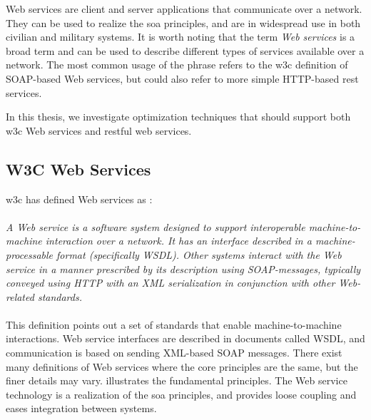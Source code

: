 Web services are client and server applications that communicate over a network.
They can be used to realize the \gls{soa} principles, and are in widespread use
in both civilian and military systems. It is worth noting that the term
\textit{Web services} is a broad term and can be used to describe different
types of services available over a network. The most common usage of the phrase
refers to the \gls{w3c} definition of SOAP-based Web services, but could also
refer to more simple HTTP-based \gls{rest} services.

In this thesis, we investigate optimization techniques that should support both
\gls{w3c} Web services and \gls{rest}ful web services.

\subsection{W3C Web Services}
\label{w3c-web-services}

\gls{w3c} has defined Web services as \cite{wrc-web-service}:

\paragraph{}
\textit{
    A Web service is a software system designed to support interoperable
    machine-to-machine interaction over a network. It has an interface described in
    a machine-processable format (specifically WSDL). Other systems interact with
    the Web service in a manner prescribed by its description using SOAP-messages,
    typically conveyed using HTTP with an XML serialization in conjunction with
    other Web-related standards.
}

\paragraph{}

This definition points out a set of standards that enable machine-to-machine
interactions. Web service interfaces are described in documents called WSDL, and
communication is based on sending XML-based SOAP messages. There exist many
definitions of Web services where the core principles are the same, but the
finer details may vary.  illustrates the
fundamental principles. The Web service technology is a realization of the
\gls{soa} principles, and provides loose coupling and eases integration between
systems.


